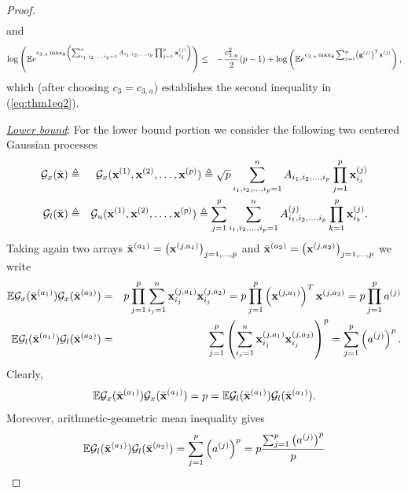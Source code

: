 \documentclass[10pt]{article}
\def\x{{\bf x}}
\def\x{{\mathbf x}}
\def\x{{\bf x}}
\def\x{{\bf x}}
\def\g{{\bf g}}
\def\mE{{\mathbb E}}
\def\lp{\left (}
\def\rp{\right )}
\def\x{{\bf x}}
\def\x{{\mathbf x}}
\def\x{{\bf x}}
\def\x{{\bf x}}
\def\g{{\bf g}}
\def\cG{{\mathcal G}}
\begin{document}
\begin{proof}
\begin{eqnarray}
\end{eqnarray}
and
\begin{eqnarray}
\label{eq:mr9}
   \log \lp \mE e^{c_{3,u} \max_{\bar{\x}}  \lp \sum_{i_1,i_2,\dots,i_p=1}^n A_{i_1,i_2,\dots,i_p}\prod_{j=1}^{p}\x_{i_j}^{(j)}    \rp  }
   \rp
   &\leq &
   -\frac{c_{3,u}^2}{2}(p-1) + \log \lp
    \mE e^{c_{3,u}  \max_{\bar{\x}}  \sum_{j=1}^p \lp\g^{(j)}\rp^T\x^{(j)}   }
    \rp, \nonumber \\
\end{eqnarray}
which (after choosing $c_3=c_{3,u}$) establishes the second inequality in (\ref{eq:thm1eq2}).




\noindent \underline{\emph{Lower bound}}: For the lower bound portion we  consider the following two centered Gaussian processes
  \begin{eqnarray}
\label{eq:mr10}
\cG_x (\bar{\x}) & \triangleq &  \cG_x (\x^{(1)},\x^{(2)},\dots,\x^{(p)})  \triangleq \sqrt{p} \sum_{i_1,i_2,\dots,i_p=1}^n A_{i_1,i_2,\dots,i_p}\prod_{j=1}^{p}\x_{i_j}^{(j)}   \nonumber   \\
\cG_l (\bar{\x}) & \triangleq & \cG_u (\x^{(1)},\x^{(2)},\dots,\x^{(p)})  \triangleq \sum_{j=1}^p \sum_{i_1,i_2,\dots,i_p=1}^n A^{(j)}_{i_1,i_2,\dots,i_p}\prod_{k=1}^{p}\x_{i_k}^{(j)} .
  \end{eqnarray}
Taking again two arrays $\bar{\x}^{(a_1)}=\lp \x^{(j,a_1)}\rp_{j=1,\dots,p}$ and $\bar{\x}^{(a_2)}=\lp \x^{(j,a_2)}\rp_{j=1,\dots,p}$ we write
  \begin{eqnarray}
\label{eq:mr12}
\mE \cG_x (\bar{\x}^{(a_1)})\cG_x (\bar{\x}^{(a_2)} )   & =  &  p \prod_{j=1}^{p}  \sum_{i_j=1}^n   \x_{i_j}^{(j,a_1)}  \x_{i_j}^{(j,a_2)}
=  p \prod_{j=1}^{p}  \lp \x^{(j,a_1)} \rp^T\x^{(j,a_2)} =  p \prod_{j=1}^{p}  a^{(j)} \nonumber   \\
\mE \cG_l (\bar{\x}^{(a_1)})\cG_l (\bar{\x}^{(a_2)} )   & =  & \sum_{j=1}^p  \lp \sum_{i_j=1}^n \x_{i_j}^{(j,a_1)}\x_{i_j}^{(j,a_2)} \rp^p
=
\sum_{j=1}^p \lp a^{(j)}\rp^p.
  \end{eqnarray}
  Clearly,
 \begin{eqnarray}
\label{eq:mr12a}
\mE \cG_x (\bar{\x}^{(a_1)})\cG_x (\bar{\x}^{(a_1)} )
 = p  =
\mE \cG_l (\bar{\x}^{(a_1)})\cG_l (\bar{\x}^{(a_1)} )  .
  \end{eqnarray}
Moreover, arithmetic-geometric mean inequality gives
 \begin{eqnarray}
\label{eq:mr13}
 \mE \cG_l (\bar{\x}^{(a_1)})\cG_l (\bar{\x}^{(a_2)} )  =
 \sum_{j=1}^p \lp a^{(j)}\rp^p  = p \frac{ \sum_{j=1}^p \lp a^{(j)}\rp^p }{p}

\end{eqnarray}
\end{proof}
\end{document}
